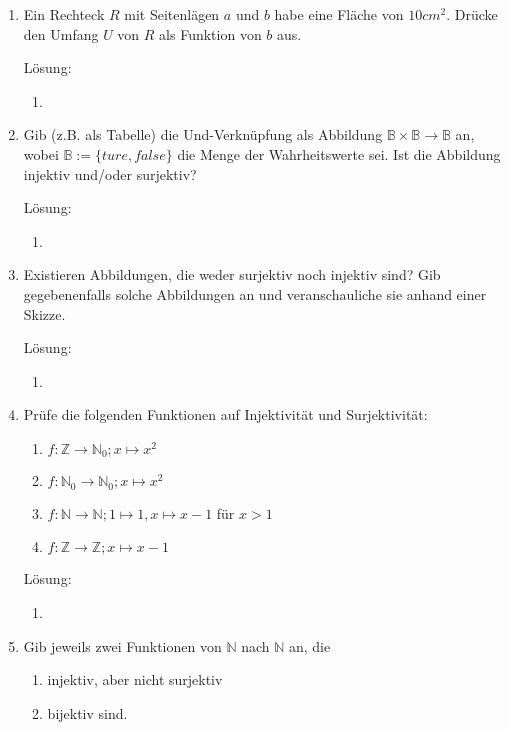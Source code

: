 \documentclass[../main.tex]{subfiles}
\begin{document}
\begin{enumerate}
	\item Ein Rechteck \( R \) mit Seitenlägen \( a \) und \( b \)
	      habe eine Fläche von \( 10 cm^2 \). Drücke den Umfang \( U \) von \( R \) als Funktion von \( b \) aus.

	      Lösung:
	      \begin{enumerate}
		      \item
	      \end{enumerate}
	\item  Gib (z.B. als Tabelle) die Und-Verknüpfung als Abbildung \( \mathbb{B} \times \mathbb{B} \rightarrow \mathbb{B} \) an,
	      wobei \( \mathbb{B} := \{ ture, false \} \) die Menge der Wahrheitswerte sei.
	      Ist die Abbildung injektiv und/oder surjektiv?

	      Lösung:
	      \begin{enumerate}
		      \item
	      \end{enumerate}
	\item Existieren Abbildungen, die weder surjektiv noch injektiv sind?
	      Gib gegebenenfalls solche Abbildungen an und veranschauliche sie anhand einer Skizze.

	      Lösung:
	      \begin{enumerate}
		      \item
	      \end{enumerate}
	\item Prüfe die folgenden Funktionen auf Injektivität und Surjektivität:
	      \begin{enumerate}
		      \item \( f: \mathbb{Z} \rightarrow \mathbb{N}_0 ; x \mapsto x^2 \)
		      \item \( f: \mathbb{N}_0 \rightarrow \mathbb{N}_0 ; x \mapsto x^2 \)
		      \item \( f: \mathbb{N} \rightarrow \mathbb{N}; 1 \mapsto 1, x \mapsto x - 1 \) für \( x > 1 \)
		      \item \( f: \mathbb{Z} \rightarrow \mathbb{Z}; x \mapsto x - 1 \)
	      \end{enumerate}

	      Lösung:
	      \begin{enumerate}
		      \item
	      \end{enumerate}
	\item Gib jeweils zwei Funktionen von \( \mathbb{N} \) nach \( \mathbb{N} \) an, die
	      \begin{enumerate}
		      \item injektiv, aber nicht surjektiv
		      \item bijektiv sind.
	      \end{enumerate}


\end{enumerate}
\end{document}
